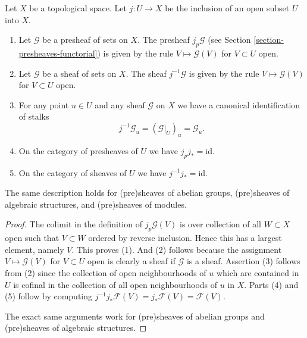 \begin{lemma}
\label{lemma-j-pullback}
Let $X$ be a topological space.
Let $j : U \to X$ be the inclusion of an open subset $U$ into $X$.
\begin{enumerate}
\item Let $\mathcal{G}$ be a presheaf of sets on $X$.
The presheaf $j_p\mathcal{G}$
(see Section \ref{section-presheaves-functorial}) is given by the rule
$V \mapsto \mathcal{G}(V)$ for $V \subset U$ open.
\item Let $\mathcal{G}$ be a sheaf of sets on $X$.
The sheaf $j^{-1}\mathcal{G}$ is given by the rule
$V \mapsto \mathcal{G}(V)$ for $V \subset U$ open.
\item For any point $u \in U$ and any sheaf $\mathcal{G}$ on $X$
we have a canonical identification of stalks
$$
j^{-1}\mathcal{G}_u = (\mathcal{G}|_U)_u = \mathcal{G}_u.
$$
\item On the category of presheaves of $U$ we have $j_pj_* = \text{id}$.
\item On the category of sheaves of $U$ we have $j^{-1}j_* = \text{id}$.
\end{enumerate}
The same description holds for (pre)sheaves of abelian groups,
(pre)sheaves of algebraic structures, and (pre)sheaves of modules.
\end{lemma}

\begin{proof}
The colimit in the definition of $j_p\mathcal{G}(V)$
is over collection of all $W \subset X$ open such that $V \subset W$
ordered by reverse inclusion.
Hence this has a largest element, namely $V$. This proves (1).
And (2) follows because the assignment $V \mapsto \mathcal{G}(V)$
for $V \subset U$ open is clearly a sheaf if $\mathcal{G}$ is a
sheaf. Assertion (3) follows from (2) since the collection
of open neighbourhoods of $u$ which are contained in $U$ is cofinal
in the collection of all open neighbourhoods of $u$ in $X$.
Parts (4) and (5) follow by computing 
$j^{-1}j_*\mathcal{F}(V) = j_*\mathcal{F}(V) = \mathcal{F}(V)$.

\medskip\noindent
The exact same arguments work for (pre)sheaves of abelian groups
and (pre)sheaves of algebraic structures.
\end{proof}

